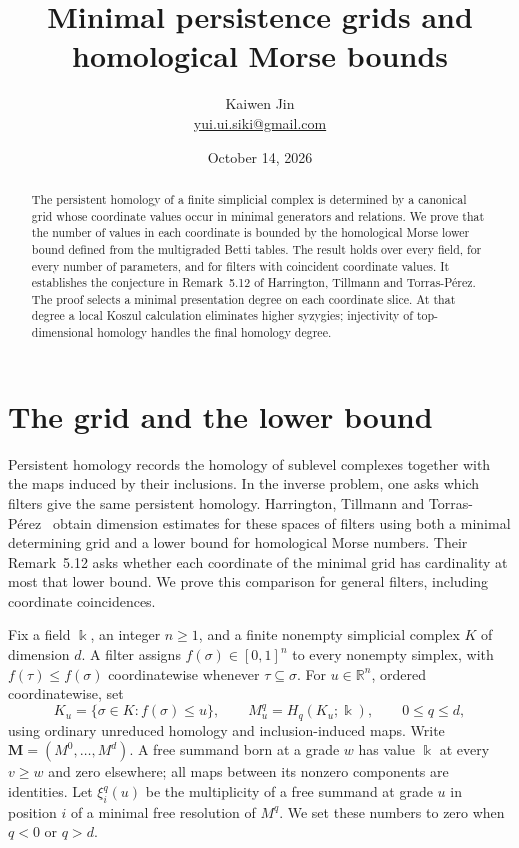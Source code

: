 \documentclass[11pt]{article}
\title{Minimal persistence grids and homological Morse bounds}
\author{Kaiwen Jin\\\small\href{mailto:yui.ui.siki@gmail.com}{yui.ui.siki@gmail.com}}
\date{October 14, 2026}
\newcommand{\kk}{\Bbbk}
\begin{document}
\maketitle

\begin{abstract}
The persistent homology of a finite simplicial complex is determined by a
canonical grid whose coordinate values occur in minimal generators and
relations. We prove that the number of values in each coordinate is bounded
by the homological Morse lower bound defined from the multigraded Betti
tables. The result holds over every field, for every number of parameters,
and for filters with coincident coordinate values. It establishes the
conjecture in Remark~5.12 of Harrington, Tillmann and Torras-P\'erez.
The proof selects a minimal presentation degree on each coordinate slice.
At that degree a local Koszul calculation eliminates higher syzygies;
injectivity of top-dimensional homology handles the final homology degree.
\end{abstract}

\section{The grid and the lower bound}

Persistent homology records the homology of sublevel complexes together
with the maps induced by their inclusions. In the inverse problem, one asks
which filters give the same persistent homology. Harrington, Tillmann and
Torras-P\'erez~\cite{HHT} obtain dimension estimates for these spaces of
filters using both a minimal determining grid and a lower bound for
homological Morse numbers. Their Remark~5.12 asks whether each coordinate
of the minimal grid has cardinality at most that lower bound. We prove
this comparison for general filters, including coordinate coincidences.

Fix a field $\kk$, an integer $n\ge1$, and a finite nonempty simplicial
complex $K$ of dimension $d$. A filter assigns $f(\sigma)\in[0,1]^n$
to every nonempty simplex, with $f(\tau)\le f(\sigma)$ coordinatewise
whenever $\tau\subseteq\sigma$. For $u\in\mathbb R^n$, ordered
coordinatewise, set
\[
 K_u=\{\sigma\in K:f(\sigma)\le u\},\qquad
 M_u^q=H_q(K_u;\kk),\qquad 0\le q\le d,
\]
using ordinary unreduced homology and inclusion-induced maps. Write
$\mathbf M=(M^0,\ldots,M^d)$. A free summand born at a grade $w$
has value $\kk$ at every $v\ge w$ and zero elsewhere; all maps
between its nonzero components are identities.
Let $\xi_i^q(u)$ be the multiplicity of a free summand at grade $u$
in position $i$ of a minimal free resolution of $M^q$. We set these
numbers to zero when $q<0$ or $q>d$.
\end{document}
